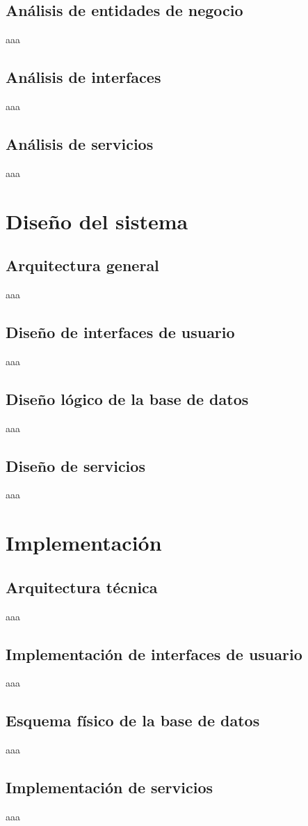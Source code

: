 \subsection{Análisis de entidades de negocio}
aaa
\subsection{Análisis de interfaces}
aaa
\subsection{Análisis de servicios}
aaa
\section{Diseño del sistema}
\subsection{Arquitectura general}
aaa
\subsection{Diseño de interfaces de usuario}
aaa
\subsection{Diseño lógico de la base de datos}
aaa
\subsection{Diseño de servicios}
aaa
\section{Implementación}
\subsection{Arquitectura técnica}
aaa
\subsection{Implementación de interfaces de usuario}
aaa
\subsection{Esquema físico de la base de datos}
aaa
\subsection{Implementación de servicios}
aaa
